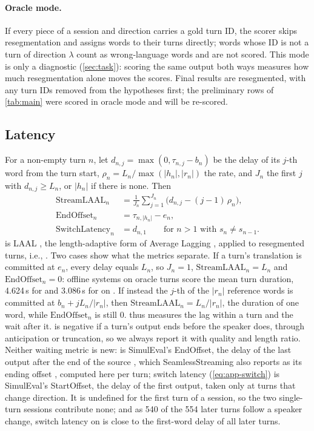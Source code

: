 \paragraph{Oracle mode.}
If every piece of a session and direction carries a gold turn ID, the scorer skips resegmentation and assigns words to their turns directly; words whose ID is not a turn of direction $\lambda$ count as wrong-language words and are not scored. This mode is only a diagnostic (\cref{sec:task}): scoring the same output both ways measures how much resegmentation alone moves the scores. Final results are resegmented, with any turn IDs removed from the hypotheses first; the preliminary rows of \cref{tab:main} were scored in oracle mode and will be re-scored.

\subsection{Latency}

For a non-empty turn $n$, let $d_{n,j}=\max(0,\tau_{n,j}-b_n)$ be the delay of its $j$-th word from the turn start, $\rho_n=L_n/\max(|h_n|,|r_n|)$ the rate, and $J_n$ the first $j$ with $d_{n,j}\ge L_n$, or $|h_n|$ if there is none. Then
\begin{align}
  \mathrm{StreamLAAL}_n &= \frac{1}{J_n}\sum_{j=1}^{J_n}\bigl(d_{n,j}-(j-1)\,\rho_n\bigr), \label{eq:app-laal}\\
  \mathrm{EndOffset}_n &= \tau_{n,|h_n|}-e_n, \label{eq:app-eo}\\
  \mathrm{SwitchLatency}_n &= d_{n,1}\qquad\text{for } n>1 \text{ with } s_n\neq s_{n-1}. \label{eq:app-switch}
\end{align}
 is LAAL \citep{papi2022overgeneration}, the length-adaptive form of Average Lagging \citep{ma2019stacl}, applied to resegmented turns, i.e., \laal \citep{papi2024streamatt}. Two cases show what the metrics separate. If a turn's translation is committed at $e_n$, every delay equals $L_n$, so $J_n=1$, $\mathrm{StreamLAAL}_n=L_n$ and $\mathrm{EndOffset}_n=0$: offline systems on oracle turns score the mean turn duration, 4.624\,s for \ende and 3.086\,s for \deen on \taxi. If instead the $j$-th of the $|r_n|$ reference words is committed at $b_n+jL_n/|r_n|$, then $\mathrm{StreamLAAL}_n=L_n/|r_n|$, the duration of one word, while $\mathrm{EndOffset}_n$ is still 0. \laal thus measures the lag within a turn and \eo the wait after it. \eo is negative if a turn's output ends before the speaker does, through anticipation or truncation, so we always report it with quality and length ratio. Neither waiting metric is new: \eo is SimulEval's EndOffset, the delay of the last output after the end of the source \citep{ma2020simuleval}, which SeamlessStreaming also reports as its ending offset \citep{seamless2023seamless}, computed here per turn; switch latency (\cref{eq:app-switch}) is SimulEval's StartOffset, the delay of the first output, taken only at turns that change direction. It is undefined for the first turn of a session, so the two single-turn \taxi sessions contribute none; and as 540 of the 554 later \taxi turns follow a speaker change, switch latency on \taxi is close to the first-word delay of all later turns.


